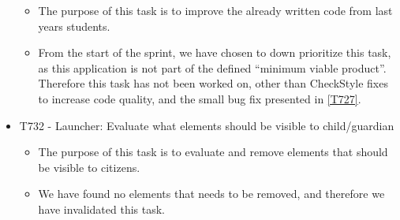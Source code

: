 \begin{itemize}
    \begin{itemize}
  	\item The purpose of this task is to improve the already written code from
  	last years students. 
  	\item From the start of the sprint, we have chosen to down prioritize this
  	task, as this application is not part of the defined ``minimum viable
  	product''. Therefore this task has not been worked on, other than CheckStyle
  	fixes to increase code quality, and the small bug fix presented in
  	\autoref{T727}.
  \end{itemize}
  \item T732 - Launcher: Evaluate what elements should be visible to
child/guardian
  \begin{itemize}
  	\item The purpose of this task is to evaluate and remove elements that should
  	be visible to citizens.
  	\item We have found no elements that needs to be removed, and therefore we
  	have invalidated this task.
  \end{itemize}
\end{itemize}





















